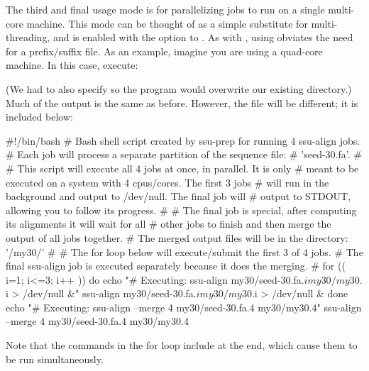The third and final  usage mode is for parallelizing
jobs to run on a single multi-core machine. This mode can be thought
of as a simple substitute for multi-threading, and is enabled with the
 option to . As with , using
 obviates the need for a prefix/suffix file. As an example,
imagine you are using a quad-core machine. In this case, execute: 


(We had to also specify  so the program would overwrite our
existing  directory.) Much of the output is the same as
before. However, the  file will be different;
it is included below:

\begin{sreoutput}
#!/bin/bash
# Bash shell script created by ssu-prep for running 4 ssu-align jobs.
# Each job will process a separate partition of the sequence file:
# 'seed-30.fa'.
#
# This script will execute all 4 jobs at once, in parallel. It is only
# meant to be executed on a system with 4 cpus/cores. The first 3 jobs
# will run in the background and output to /dev/null. The final job will
# output to STDOUT, allowing you to follow its progress.
#
# The final job is special, after computing its alignments it will wait for all
# other jobs to finish and then merge the output of all jobs together.
# The merged output files will be in the directory: '/my30/'
#
# The for loop below will execute/submit the first 3 of 4 jobs.
# The final ssu-align job is executed separately because it does the merging.
#
for (( i=1; i<=3; i++ ))
do
	echo "# Executing: ssu-align my30/seed-30.fa.$i my30/my30.$i > /dev/null &"
	ssu-align my30/seed-30.fa.$i my30/my30.$i > /dev/null &
done
echo "# Executing: ssu-align --merge 4 my30/seed-30.fa.4 my30/my30.4"
ssu-align --merge 4 my30/seed-30.fa.4 my30/my30.4
\end{sreoutput}

Note that the  commands in the for loop include
\prog{\&} at the end, which cause them to be run simultaneously.










